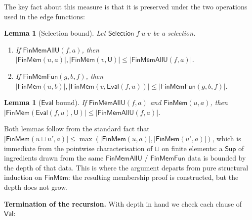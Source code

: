 \documentclass[11pt]{article}
\newcommand{\U}{\mathsf{U}}
\newcommand{\Val}{\mathsf{Val}}
\newcommand{\EvalFun}{\mathsf{Eval}}
\newcommand{\Selection}{\mathsf{Selection}}
\newcommand{\depthFM}[2]{|\mathsf{FinMem}(#1,#2)|}
\newcommand{\depthAllU}[2]{|\mathsf{FinMemAllU}(#1,#2)|}
\newcommand{\depthFun}[3]{|\mathsf{FinMemFun}(#1,#2,#3)|}
\newtheorem{lemma}[theorem]{Lemma}
\begin{document}
The key fact about this measure is that it is preserved under the two
operations used in the edge functions:
\begin{lemma}[Selection bound]\label{lem:sel-depth}
  Let $\Selection\;f\;u\;v$ be a selection.
  \begin{enumerate}
  \item If $\mathsf{FinMemAllU}(f,a)$, then
    $\depthFM{u}{a}, \depthFM{v}{\U} \leq \depthAllU{f}{a}$.
  \item If $\mathsf{FinMemFun}(g,b,f)$, then
    $\depthFM{u}{b}, \depthFM{v}{\EvalFun(f,u)} \leq \depthFun{g}{b}{f}$.
  \end{enumerate}
\end{lemma}

\begin{lemma}[$\EvalFun$ bound]\label{lem:eval-depth}
  If $\mathsf{FinMemAllU}(f,a)$ and $\mathsf{FinMem}(u,a)$, then
  $\depthFM{\EvalFun(f,u)}{\U} \leq \depthAllU{f}{a}$.
\end{lemma}

\noindent Both lemmas follow from the standard fact that
$\depthFM{u \sqcup u'}{a} \leq \max(\depthFM{u}{a}, \depthFM{u'}{a})$,
which is immediate from the pointwise characterisation of $\sqcup$ on
finite elements: a $\mathsf{Sup}$ of ingredients drawn from the same
$\mathsf{FinMemAllU}$ / $\mathsf{FinMemFun}$ data is bounded by the depth
of that data.  This is where the argument departs from pure structural
induction on $\mathsf{FinMem}$: the resulting membership proof is
constructed, but the depth does not grow.

\medskip\noindent\textbf{Termination of the recursion.}
With depth in hand we check each clause of $\Val$:
\end{document}

